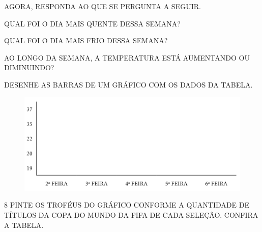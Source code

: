 AGORA, RESPONDA AO QUE SE PERGUNTA A SEGUIR.

\begin{escolha}
\item QUAL FOI O DIA MAIS QUENTE DESSA SEMANA?

\item{}

\item QUAL FOI O DIA MAIS FRIO DESSA SEMANA?

\item{}

\item AO LONGO DA SEMANA, A TEMPERATURA ESTÁ AUMENTANDO OU DIMINUINDO?

\item{}

\item DESENHE AS BARRAS DE UM GRÁFICO COM OS DADOS DA TABELA.

\begin{figure}[htpb!]
\centering
\includegraphics[width=\textwidth]{./media/SAEB_1ANO_MAT_FIGURA106.png}
\end{figure}

\end{escolha}


\num{8} PINTE OS TROFÉUS DO GRÁFICO CONFORME A QUANTIDADE DE TÍTULOS DA COPA DO
MUNDO DA FIFA DE CADA SELEÇÃO. CONFIRA A TABELA.

